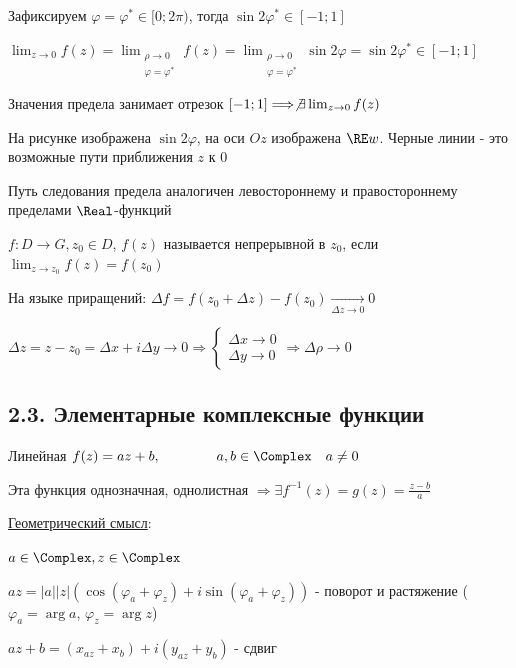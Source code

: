 \documentclass[12pt]{article}
\begin{document}
Зафиксируем $\varphi = \varphi^* \in [0; 2\pi)$, тогда $\sin 2\varphi^* \in [-1; 1]$

$\lim_{z \to 0} f(z) = \lim_{\substack{\rho \to 0 \\ \varphi = \varphi^*}} f(z) = 
\lim_{\substack{\rho \to 0 \\ \varphi = \varphi^*}} \sin 2\varphi = \sin 2\varphi^* \in [-1; 1]$

Значения предела занимает отрезок $[-1; 1] \Longrightarrow \not\exists \lim_{z \to 0} f(z)$

На рисунке изображена $\sin 2\varphi$, на оси $Oz$ изображена $\RE w$. Черные линии - это возможные пути приближения $z$ к $0$

\Nota Путь следования предела аналогичен левостороннему и правостороннему пределами $\Real$-функций

\hypertarget{continuity}{}


$f : D \longrightarrow G, z_0 \in D$, $f(z)$ называется непрерывной в $z_0$, если $\lim_{z \to z_0} f(z) = f(z_0)$

На языке приращений: $\Delta f = f(z_0 + \Delta z) - f(z_0) \underset{\Delta z \to 0}{\longrightarrow} 0$

$\Delta z = z - z_0 = \Delta x + i \Delta y \to 0 \Longrightarrow 
\begin{cases}\Delta x \to 0 \\ \Delta y \to 0\end{cases} \Longrightarrow 
\Delta \rho \to 0$

\subsection{2.3. Элементарные комплексные функции}

\hypertarget{elementary_functions}{}

 Линейная $f(z) = az + b, \qquad\qquad a, b \in \Complex \quad a \neq 0$

Эта функция однозначная, однолистная $\Longrightarrow \exists f^{-1}(z) = g(z) = \frac{z - b}{a}$

\underline{Геометрический смысл}:

$a \in \Complex, z \in \Complex$

$az = |a| |z| (\cos (\varphi_a + \varphi_z) + i \sin (\varphi_a + \varphi_z))$ - поворот и растяжение 
($\varphi_a = \arg a$, $\varphi_z = \arg z$)

$az + b = (x_{az} + x_b) + i (y_{az} + y_b)$ - сдвиг
\end{document}
